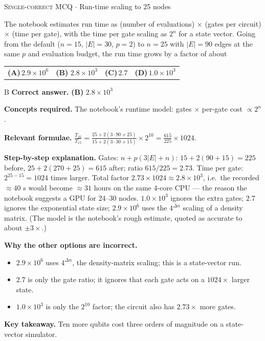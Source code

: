 \documentclass[11pt,a4paper]{article}
\newcommand{\optlabel}[1]{\textbf{(#1)}}
\newcommand{\correctlabel}[1]{\textcolor{okgreen}{\textbf{(#1)}\,\ding{51}}}
\newenvironment{qitem}[1]{\begin{list}{}{\setlength{\leftmargin}{3.3em}\setlength{\labelwidth}{3.1em}%
  \setlength{\labelsep}{0.2em}\setlength{\topsep}{3pt}\setlength{\parsep}{3pt}}\item[\textbf{Q.#1}\hfill]}{\end{list}}
\newcommand{\qsep}{\par\vspace{2pt}{\color{black!15}\hrule}\vspace{4pt}}
\newcommand{\qmeta}[2]{{\footnotesize\color{black!60}\textsc{#1} \;$\cdot$\; #2}\par}
\begin{document}
\begin{qitem}{76}
\qmeta{Single-correct MCQ}{Run-time scaling to 25 nodes}
The notebook estimates run time as (number of evaluations) $\times$ (gates per circuit) $\times$ (time per gate), with the time per
gate scaling as $2^n$ for a state vector. Going from the default ($n = 15$, $|E| = 30$, $p = 2$) to $n = 25$ with $|E| = 90$ edges at
the same $p$ and evaluation budget, the run time grows by a factor of about
\par\smallskip\noindent\begin{tabularx}{\linewidth}{@{}*{4}{L}@{}}
\optlabel{A}\,$2.9\times10^{6}$ & \correctlabel{B}\,$2.8\times10^{3}$ & \optlabel{C}\,$2.7$ & \optlabel{D}\,$1.0\times10^{3}$
\end{tabularx}
\end{qitem}
\begin{solbox}{B}
\textbf{\color{brand}Correct answer.} \textcolor{okgreen}{\textbf{(B)}} $2.8\times10^{3}$

\textbf{\color{brand}Concepts required.} The notebook's runtime model: gates $\times$ per-gate cost $\propto 2^n$.

\textbf{\color{brand}Relevant formulae.} $\frac{T_{25}}{T_{15}} = \frac{25 + 2(3\cdot90 + 25)}{15 + 2(3\cdot30 + 15)}\times2^{10} = \frac{615}{225}\times1024$.

\textbf{\color{brand}Step-by-step explanation.} Gates: $n + p(3|E| + n)$: $15 + 2(90 + 15) = 225$ before, $25 + 2(270 + 25) = 615$ after; ratio $615/225 = 2.73$.
Time per gate: $2^{25-15} = 1024$ times larger. Total factor $2.73\times1024 \approx 2.8\times10^3$, i.e.\ the recorded
$\approx 40$ s would become $\approx 31$ hours on the same 4-core CPU --- the reason the notebook suggests a GPU for 24--30 nodes.
$1.0\times10^3$ ignores the extra gates; $2.7$ ignores the exponential state size; $2.9\times10^6$ uses the $4^{\Delta n}$ scaling of a
density matrix. (The model is the notebook's rough estimate, quoted as accurate to about $\pm3\times$.)

\textbf{\color{brand}Why the other options are incorrect.}
\begin{itemize}[leftmargin=2.4em, itemsep=1pt, topsep=2pt]
\item[\textbf{(A)}] $2.9\times10^6$ uses $4^{\Delta n}$, the density-matrix scaling; this is a state-vector run.
\item[\textbf{(C)}] $2.7$ is only the gate ratio; it ignores that each gate acts on a $1024\times$ larger state.
\item[\textbf{(D)}] $1.0\times10^3$ is only the $2^{10}$ factor; the circuit also has $2.73\times$ more gates.
\end{itemize}
\textbf{\color{brand}Key takeaway.} Ten more qubits cost three orders of magnitude on a state-vector simulator.
\end{solbox}
\qsep
\end{document}
